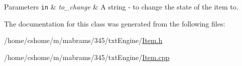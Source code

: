 \begin{DoxyParams}[1]{\-Parameters}
\mbox{\tt in}  & {\em to\-\_\-change} & \-A string -\/ to change the state of the item to. \\
\hline
\end{DoxyParams}


\-The documentation for this class was generated from the following files\-:\begin{DoxyCompactItemize}
\item 
/home/cshome/m/mabrams/345/txt\-Engine/\hyperlink{_item_8h}{\-Item.\-h}\item 
/home/cshome/m/mabrams/345/txt\-Engine/\hyperlink{_item_8cpp}{\-Item.\-cpp}\end{DoxyCompactItemize}
